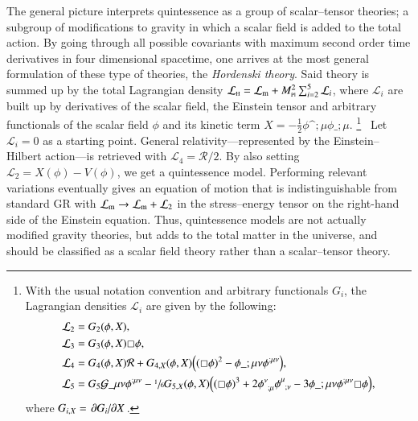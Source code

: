 









The general picture interprets quintessence as a group of scalar--tensor theories; a subgroup of modifications to gravity in which a scalar field is added to the total action. By going through all possible covariants with maximum second order time derivatives in four dimensional spacetime, one arrives at the most general formulation of these type of theories, the \emph{Hordenski theory}. Said theory is summed up by the total Lagrangian density $\mathcal{L}_{\text{\tiny{H}}} = \mathcal{L}_\mathrm{m} + M_{\text{\tiny{Pl}}}^2 \sum_{i=2}^{5} \mathcal{L}_i$, where $\mathcal{L}_i$ are built up by derivatives of the scalar field, the Einstein tensor and arbitrary functionals of the scalar field $\phi$ and its kinetic term $X = - \frac{1}{2} \phi\^{;\mu}\phi\_{;\mu}$.%
\footnote{%
With the usual notation convention and arbitrary functionals $G_i$, the Lagrangian densities $\mathcal{L}_i$ are given by the following:
\begin{equation*}
    \begin{split}
        \mathcal{L}_2 &= G_2(\phi, X), \\
        \mathcal{L}_3 &= G_3 (\phi, X)\sq \phi, \\
        \mathcal{L}_4 &= G_4 (\phi, X)\mathcal{R} + G_{4,X}(\phi, X) \pclosed{ {(\sq \phi)}^2 - \phi\_{;\mu\nu} \phi\^{;\mu\nu}}, \\
        \mathcal{L}_5 &= G_5 \mathcal{G}\_{\mu\nu}\phi\^{;\mu\nu} - \sfrac{1}{6} G_{5,X}(\phi, X)  \pclosed{ {(\sq \phi)}^3 + 
        2\phi\indices{^\nu_{;\mu}}\phi\indices{^\mu_{;\nu}} - 3  \phi\_{;\mu\nu} \phi\^{;\mu\nu} \sq \phi},
    \end{split}
\end{equation*}%
where $G_{i,X}= \pdv*{G_i}{X}$.
}~%
Let $\mathcal{L}_i=0$ as a starting point. %
General relativity---represented by the Einstein--Hilbert action---is retrieved with $\mathcal{L}_4 = \mathcal{R}/2$.  By also setting $\mathcal{L}_2 = X(\phi)-V(\phi)$, we get a quintessence model. Performing relevant variations eventually gives an equation of motion that is indistinguishable from standard GR with $\mathcal{L}_\mathrm{m} \to \mathcal{L}_\mathrm{m} + \mathcal{L}_2$ in the stress--energy tensor on the right-hand side of the Einstein equation. Thus, quintessence models are not actually modified gravity theories, but adds to the total matter in the universe, and should be classified as a scalar field theory rather than a scalar--tensor theory. %





